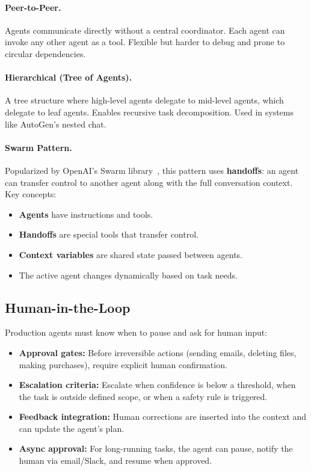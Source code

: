 \paragraph{Peer-to-Peer.}
\label{peer-to-peer.}

Agents communicate directly without a central coordinator. Each agent can invoke any other agent as a tool. Flexible but harder to debug and prone to circular dependencies.

\paragraph{Hierarchical (Tree of Agents).}
\label{hierarchical-tree-of-agents.}

A tree structure where high-level agents delegate to mid-level agents, which delegate to leaf agents. Enables recursive task decomposition. Used in systems like AutoGen’s nested chat.

\paragraph{Swarm Pattern.}
\label{swarm-pattern.}

Popularized by OpenAI’s Swarm library~\cite{openai2024swarm}, this pattern uses \textbf{handoffs}: an agent can transfer control to another agent along with the full conversation context. Key concepts:

\begin{itemize}
  \item \textbf{Agents} have instructions and tools.
  \item \textbf{Handoffs} are special tools that transfer control.
  \item \textbf{Context variables} are shared state passed between agents.
  \item The active agent changes dynamically based on task needs.
\end{itemize}

\subsection{Human-in-the-Loop}
\label{human-in-the-loop}

Production agents must know when to pause and ask for human input:

\begin{itemize}
  \item \textbf{Approval gates:} Before irreversible actions (sending emails, deleting files, making purchases), require explicit human confirmation.
  \item \textbf{Escalation criteria:} Escalate when confidence is below a threshold, when the task is outside defined scope, or when a safety rule is triggered.
  \item \textbf{Feedback integration:} Human corrections are inserted into the context and can update the agent’s plan.
  \item \textbf{Async approval:} For long-running tasks, the agent can pause, notify the human via email/Slack, and resume when approved.
\end{itemize}

